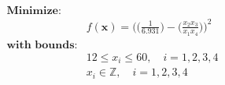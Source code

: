 \begin{align*}
\textbf{Minimize:} & \\
& f(\bm{x}) = \Big(\Big(\frac{1}{6.931}\Big) - \Big(\frac{x_2 x_3}{x_1 x_4} \Big)  \Big)^2 \\[0.5em]
\textbf{with bounds:} & \\
& 12 \leq x_i \leq 60, \quad i = 1, 2, 3, 4 \\
& x_i \in \mathbb{Z}, \quad i = 1, 2, 3, 4
\end{align*}